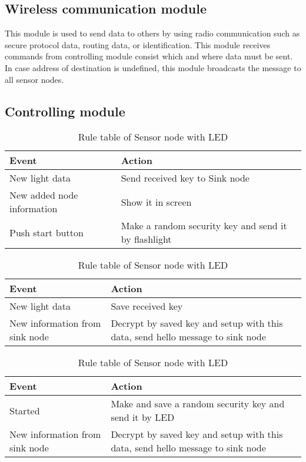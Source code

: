 \subsection{Wireless communication module}
This module is used to send data to others by using radio communication such as secure protocol data, routing data, or identification. This module receives commands from controlling module consist which and where data must be sent. In case address of destination is undefined, this module broadcasts the message to all sensor nodes.

\subsection{Controlling module}

\begin{table}[hp]
\caption{Rule table of Smartphone}
\label{tab:implement_rule_smartphone}
\begin{center}
\begin{tabular}{|p{5cm}|p{8cm}|}
\hline
Event&Action\\
\hline
{New light data}&{Send received key to Sink node}\\
\hline
{New added node information}&{Show it in screen}\\
\hline
{Push start button}& {Make a random security key and send it by flashlight}\\
\hline
\end{tabular}
\end{center}

\caption{Rule table of Sensor node with light sensor}
\label{tab:implement_rule_node_sensor}
\begin{center}
\begin{tabular}{|p{5cm}|p{8cm}|}
\hline
Event&Action\\
\hline
{New light data}&{Save received key}\\
\hline
{New information from sink node}&{Decrypt by saved key and setup with this data, send hello message to sink node}\\
\hline
\end{tabular}
\end{center}

\caption{Rule table of Sensor node with LED}
\label{tab:implement_rule_node_led}
\begin{center}
\begin{tabular}{|p{5cm}|p{8cm}|}
\hline
Event&Action\\
\hline
{Started}&{Make and save a random security key and send it by LED}\\
\hline
{New information from sink node}&{Decrypt by saved key and setup with this data, send hello message to sink node}\\
\hline
\end{tabular}
\end{center}


\end{table}
